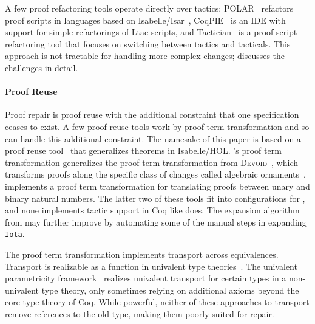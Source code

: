 A few proof refactoring tools operate directly over tactics:
POLAR~\cite{Dietrich2013} refactors proof scripts in languages based on Isabelle/Isar~\cite{Wenzel2007isar},
CoqPIE~\cite{Roe2016} is an IDE with support for simple refactorings of Ltac scripts, and
Tactician~\cite{adams2015} is a proof script refactoring tool that focuses on switching between tactics and tacticals.
This approach is not tractable for handling more complex changes;
\citet{robert2018} discusses the challenges in detail.

\paragraph{Proof Reuse}

Proof repair is proof reuse with the additional constraint that one specification ceases to exist.
A few proof reuse tools work by proof term transformation and so can handle this additional constraint.
The namesake of this paper is based on a proof reuse tool~\cite{Johnsen2004}
that generalizes theorems in Isabelle/HOL.
\toolname's proof term transformation generalizes the proof term transformation from \textsc{Devoid}~\cite{Ringer2019},
which transforms proofs along the specific class of changes called algebraic ornaments~\cite{mcbride}.
\citet{magaud2000changing} implements a proof term transformation for translating proofs between
unary and binary natural numbers. 
The latter two of these tools fit into configurations for \toolname,
and none implements tactic support in Coq like \toolname does.
The expansion algorithm from \citet{magaud2000changing} may further improve \toolname
by automating some of the manual steps in expanding \lstinline{Iota}.

The \toolname proof term transformation implements transport across equivalences.
Transport is realizable as a function in univalent type theories~\cite{univalent2013homotopy}.
The univalent parametricity framework~\cite{tabareau2017equivalences} realizes univalent transport for certain types
in a non-univalent type theory, only sometimes relying on additional axioms beyond the core type theory of Coq.
While powerful, neither of these approaches to transport remove references to the old type, making them poorly suited for repair.

